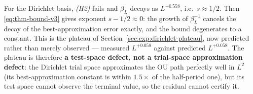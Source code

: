 \begin{remark}
For the Dirichlet basis, \emph{(H2)} fails and $\beta_L$ decays as $L^{-0.558}$,
i.e.\ $s \approx 1/2$. Then \eqref{eq:thm-bound-v3} gives exponent
$s - 1/2 \approx 0$: the growth of $\beta_L^{-1}$ cancels the decay of the
best-approximation error exactly, and the bound degenerates to a constant. This
is the plateau of Section~\ref{sec:exp:dirichlet-plateau}, now predicted rather
than merely observed --- measured $L^{+0.058}$ against predicted $L^{+0.058}$.
The plateau is therefore \textbf{a test-space defect, not a trial-space
approximation defect}: the Dirichlet trial space approximates the OU path
perfectly well in $L^2$ (its best-approximation constant is within $1.5\times$ of
the half-period one), but its test space cannot observe the terminal value, so
the residual cannot certify it.
\end{remark}
